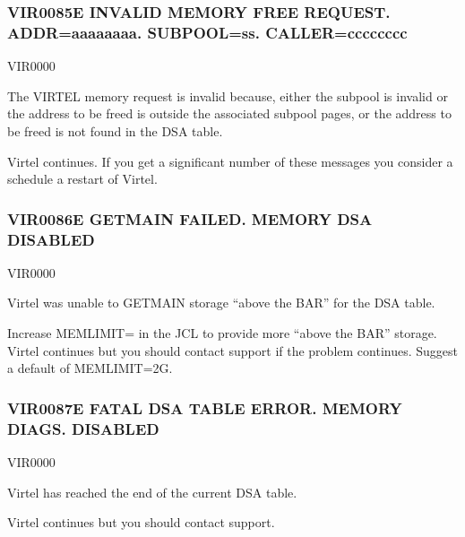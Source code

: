 \documentclass[letterpaper,10pt,english]{sphinxmanual}
\begin{document}
\subsubsection{VIR0085E INVALID MEMORY FREE REQUEST. ADDR=aaaaaaaa. SUBPOOL=ss. CALLER=cccccccc}
\label{\detokenize{messages:vir0085e-invalid-memory-free-request-addr-aaaaaaaa-subpool-ss-caller-cccccccc}}\begin{description}
\sphinxAtStartPar
VIR0000

\sphinxAtStartPar
The VIRTEL memory request is invalid because, either the subpool is invalid or the address to be freed is outside the associated subpool pages, or the address to be freed is not found in the DSA table.

\sphinxAtStartPar
Virtel continues. If you get a significant number of these messages you consider a schedule a restart of Virtel.

\end{description}


\subsubsection{VIR0086E GETMAIN FAILED. MEMORY DSA DISABLED}
\label{\detokenize{messages:vir0086e-getmain-failed-memory-dsa-disabled}}\begin{description}
\sphinxAtStartPar
VIR0000

\sphinxAtStartPar
Virtel was unable to GETMAIN storage “above the BAR” for the DSA table.

\sphinxAtStartPar
Increase MEMLIMIT= in the JCL to provide more “above the BAR” storage. Virtel continues but you should contact support if the problem continues. Suggest a default of MEMLIMIT=2G.

\end{description}


\subsubsection{VIR0087E FATAL DSA TABLE ERROR. MEMORY DIAGS. DISABLED}
\label{\detokenize{messages:vir0087e-fatal-dsa-table-error-memory-diags-disabled}}\begin{description}
\sphinxAtStartPar
VIR0000

\sphinxAtStartPar
Virtel has reached the end of the current DSA table.

\sphinxAtStartPar
Virtel continues but you should contact support.

\end{description}
\end{document}
